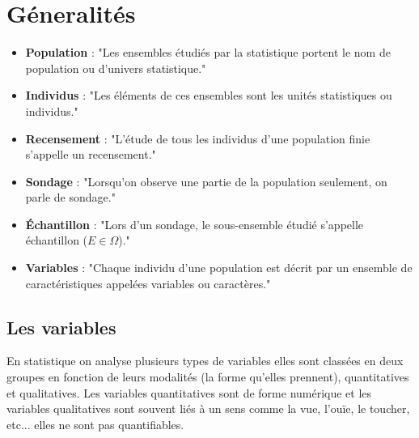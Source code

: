 \documentclass{report}
\begin{document}
\section{Géneralités}

\begin{itemize}
\item \textbf{Population} : "Les ensembles étudiés par la statistique portent le nom de population ou d’univers statistique."
\item \textbf{Individus} :  "Les éléments de ces ensembles sont les unités statistiques ou individus."
\item \textbf{Recensement} : "L’étude de tous les individus d’une population finie s’appelle un recensement." 
\item \textbf{Sondage} : "Lorsqu’on observe une partie de la population seulement, on parle de sondage."
\item \textbf{Échantillon} :  "Lors d’un sondage, le sous-ensemble étudié s’appelle échantillon (\(E\in\Omega\))." 
\item \textbf{Variables} : "Chaque individu d’une population est décrit par un ensemble de caractéristiques appelées variables ou caractères." 
\end{itemize}

\subsection{Les variables}

En statistique on analyse plusieurs types de variables elles sont classées en deux groupes en fonction de leurs modalités (la forme qu'elles prennent), quantitatives et qualitatives. Les variables quantitatives sont de forme numérique et les variables qualitatives sont souvent liés à un sens comme la vue, l'ouïe, le toucher, etc... elles ne sont pas quantifiables.
\end{document}
